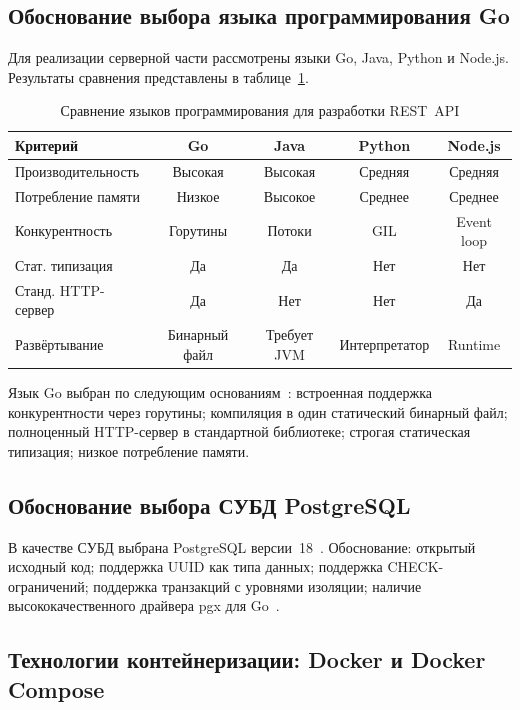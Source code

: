 \documentclass[a4paper,14pt]{extarticle}
\begin{document}
\subsection{Обоснование выбора языка программирования Go}

Для реализации серверной части рассмотрены языки Go, Java, Python и Node.js. Результаты сравнения представлены в таблице~\ref{tab:languages}.

\begin{table}[H]
\caption{Сравнение языков программирования для разработки REST~API}\label{tab:languages}
\centering
\small
\begin{tabularx}{\textwidth}{|X|c|c|c|c|}
\hline
\textbf{Критерий} & \textbf{Go} & \textbf{Java} & \textbf{Python} & \textbf{Node.js} \\
\hline
Производительность & Высокая & Высокая & Средняя & Средняя \\
\hline
Потребление памяти & Низкое & Высокое & Среднее & Среднее \\
\hline
Конкурентность & Горутины & Потоки & GIL & Event loop \\
\hline
Стат. типизация & Да & Да & Нет & Нет \\
\hline
Станд. HTTP-сервер & Да & Нет & Нет & Да \\
\hline
Развёртывание & Бинарный файл & Требует JVM & Интерпретатор & Runtime \\
\hline
\end{tabularx}
\end{table}

Язык Go выбран по следующим основаниям~\cite{donovan2021, gospec}: встроенная поддержка конкурентности через горутины; компиляция в один статический бинарный файл; полноценный HTTP-сервер в стандартной библиотеке; строгая статическая типизация; низкое потребление памяти.

\subsection{Обоснование выбора СУБД PostgreSQL}

В качестве СУБД выбрана PostgreSQL версии~18~\cite{pgdocs}. Обоснование: открытый исходный код; поддержка UUID как типа данных; поддержка CHECK-ограничений; поддержка транзакций с уровнями изоляции; наличие высококачественного драйвера pgx для Go~\cite{pgx}.

\subsection{Технологии контейнеризации: Docker и Docker Compose}
\end{document}
